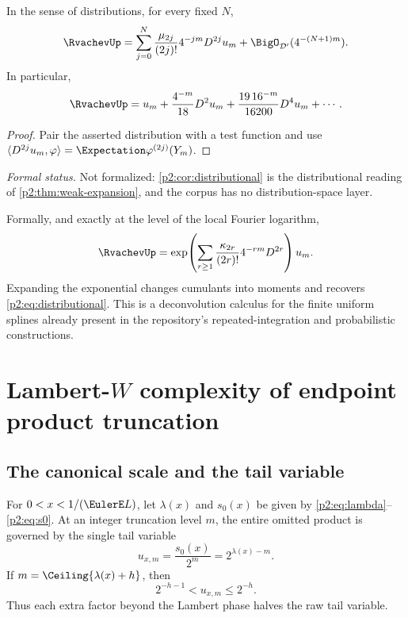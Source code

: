 \documentclass[11pt,oneside]{article}
\numberwithin{equation}{section}
\theoremstyle{definition}
\theoremstyle{remark}
\begin{document}
\begin{corollary}
\label{p2:cor:distributional}
In the sense of distributions, for every fixed $N$,
\begin{equation}
 \RvachevUp
 =\sum_{j=0}^{N}\frac{\mu_{2j}}{(2j)!}4^{-jm}D^{2j}u_m
 +\BigO_{\mathcal D'}(4^{-(N+1)m}).
 \label{p2:eq:distributional}
\end{equation}
In particular,
\begin{equation}
 \RvachevUp=u_m+\frac{4^{-m}}{18}D^2u_m
 +\frac{19\,16^{-m}}{16200}D^4u_m+\cdots.
 \label{p2:eq:distributional-first}
\end{equation}
\end{corollary}

\begin{proof}
Pair the asserted distribution with a test function and use
$\langle D^{2j}u_m,\varphi\rangle=\Expectation\varphi^{(2j)}(Y_m)$.
\end{proof}

\emph{Formal status.}  Not formalized: \cref{p2:cor:distributional} is the distributional
reading of \cref{p2:thm:weak-expansion}, and the corpus has no distribution-space layer.

\begin{remark}
Formally, and exactly at the level of the local Fourier logarithm,
\begin{equation}
 \RvachevUp=\exp\!\left(\sum_{r\ge1}
 \frac{\kappa_{2r}}{(2r)!}4^{-rm}D^{2r}\right)u_m.
 \label{p2:eq:cumulant-operator}
\end{equation}
Expanding the exponential changes cumulants into moments and recovers
\eqref{p2:eq:distributional}.  This is a deconvolution calculus for the finite uniform splines
already present in the repository's repeated-integration and probabilistic constructions.
\end{remark}

\section{Lambert-$W$ complexity of endpoint product truncation}
\label{p2:sec:Lambert-complexity}

\subsection{The canonical scale and the tail variable}

For $0<x<1/(\EulerE L)$, let $\lambda(x)$ and $s_0(x)$ be given by
\eqref{p2:eq:lambda}--\eqref{p2:eq:s0}.  At an integer truncation level $m$, the entire omitted
product is governed by the single tail variable
\begin{equation}
 u_{x,m}=\frac{s_0(x)}{2^m}=2^{\lambda(x)-m}.
 \label{p2:eq:uxm}
\end{equation}
If $m=\Ceiling{\lambda(x)+h}$, then
\begin{equation}
 2^{-h-1}<u_{x,m}\le2^{-h}.
 \label{p2:eq:u-window}
\end{equation}
Thus each extra factor beyond the Lambert phase halves the raw tail variable.
\end{document}
